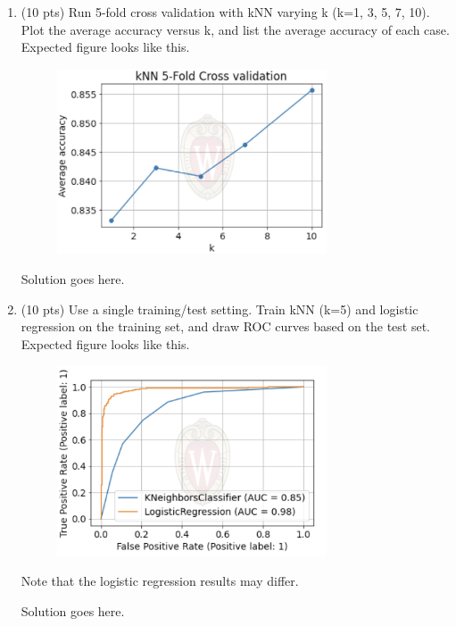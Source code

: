 \documentclass[a4paper]{article}
\theoremstyle{definition}
\newenvironment{soln}{
    \leavevmode\color{blue}\ignorespaces
}{}
\begin{document}
\begin{enumerate}
	\item (10 pts) Run 5-fold cross validation with kNN varying k (k=1, 3, 5, 7, 10). Plot the average accuracy versus k, and list the average accuracy of each case. \\
	Expected figure looks like this.
	\begin{figure}[h]
		\centering
		\includegraphics[width=8cm]{knn.png}
	\end{figure}
	
	\begin{soln}  Solution goes here. \end{soln}
	
	\item (10 pts) Use a single training/test setting. Train kNN (k=5) and logistic regression on the training set, and draw ROC curves based on the test set. \\
	Expected figure looks like this.
	\begin{figure}[h]
		\centering
		\includegraphics[width=8cm]{roc.png}
	\end{figure}
	Note that the logistic regression results may differ.
	
	\begin{soln}  Solution goes here. \end{soln}
	
\end{enumerate}

\end{document}
